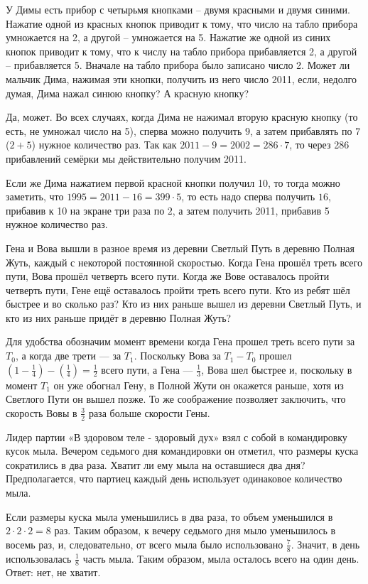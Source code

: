 
\begin{itemize}
\itC У Димы есть прибор с четырьмя кнопками – двумя красными и двумя синими. Нажатие 
одной из красных кнопок приводит к тому, что число на табло прибора умножается на 2, 
а другой – умножается на 5. Нажатие же одной из синих кнопок приводит к тому, что к числу 
на табло прибора прибавляется 2, а другой – прибавляется 5. Вначале на табло прибора 
было записано число 2. Может ли мальчик Дима, нажимая эти кнопки, получить из него число 
2011, если, недолго думая, Дима нажал синюю кнопку? А красную кнопку?

\itr Да, может. Во всех случаях, когда Дима не нажимал вторую красную кнопку (то есть, не
умножал число на 5), сперва можно получить $9$, а затем прибавлять по 7 ($2+5$) нужное
количество раз. Так как $2011-9 = 2002 = 286 \cdot 7$, то через 286 прибавлений семёрки
мы действительно получим 2011.

Если же Дима нажатием первой красной кнопки получил 10, то тогда можно заметить, что 
$1995 = 2011-16 = 399 \cdot 5$, то есть надо сперва получить $16$, прибавив к 10 на экране
три раза по $2$, а затем получить 2011, прибавив 5 нужное количество раз.
\end{itemize}

\begin{itemize}
\itC Гена и Вова вышли в разное время из деревни Светлый Путь в деревню Полная Жуть, каждый с некоторой 
постоянной скоростью. Когда Гена прошёл треть всего пути, Вова прошёл четверть всего 
пути. Когда же Вове оставалось пройти четверть пути, Гене ещё оставалось пройти треть 
всего пути. Кто из ребят шёл быстрее и во сколько раз? Кто из них раньше вышел из деревни
Светлый Путь, и кто из них раньше придёт в деревню Полная Жуть?

\itr Для удобства обозначим момент времени когда Гена прошел треть всего пути за $T_0$, 
а когда две трети --- за $T_1$. Поскольку Вова за $T_1-T_0$ прошел 
$(1-\frac{1}{4})-(\frac{1}{4}) = \frac{1}{2}$ всего пути, 
а Гена --- $\frac{1}{3}$, Вова шел быстрее и, поскольку в момент $T_1$ он уже обогнал Гену,
в Полной Жути он окажется раньше, хотя из Светлого Пути он вышел позже. 
То же соображение позволяет заключить, что скорость Вовы в $\frac{3}{2}$ раза больше
скорости Гены.
\end{itemize}

\begin{itemize}
\itC Лидер партии «В здоровом теле - здоровый дух» взял с собой в командировку 
кусок мыла. Вечером седьмого дня командировки он отметил, что размеры куска 
сократились в два раза. Хватит ли ему мыла на оставшиеся два дня? Предполагается, 
что партиец каждый день использует одинаковое количество мыла.

\itr Если размеры куска мыла уменьшились в два раза, то объем уменьшился в 
$2\cdot 2\cdot 2=8$ раз. Таким образом, к вечеру седьмого дня мыло уменьшилось 
в восемь раз, и, следовательно, от всего мыла было использовано $\frac{7}{8}$. 
Значит, в день использовалась $\frac{1}{8}$ часть мыла. Таким образом, мыла 
осталось всего на один день. Ответ: нет, не хватит.

\end{itemize}

